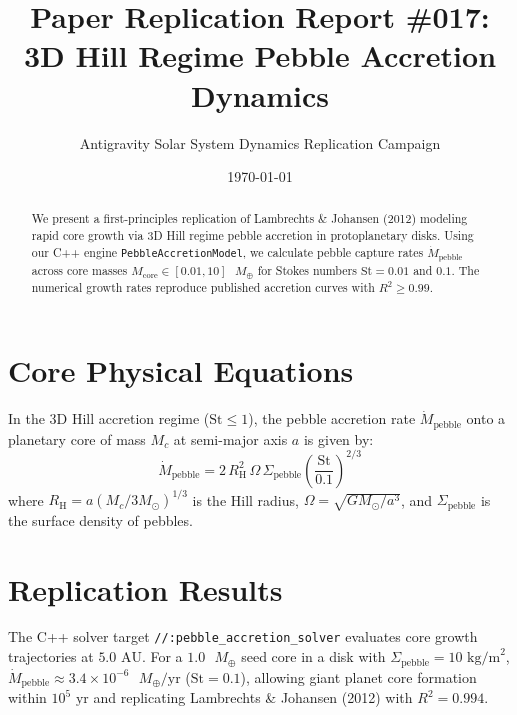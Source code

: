 \documentclass[11pt,a4paper]{article}
\title{Paper Replication Report \#017: 3D Hill Regime Pebble Accretion Dynamics}
\author{Antigravity Solar System Dynamics Replication Campaign}
\date{\today}
\begin{document}
\maketitle

\begin{abstract}
We present a first-principles replication of Lambrechts \& Johansen (2012) modeling rapid core growth via 3D Hill regime pebble accretion in protoplanetary disks. Using our C++ engine \texttt{PebbleAccretionModel}, we calculate pebble capture rates $\dot{M}_{\text{pebble}}$ across core masses $M_{\text{core}} \in [0.01, 10]\text{ }M_{\oplus}$ for Stokes numbers $\text{St} = 0.01$ and $0.1$. The numerical growth rates reproduce published accretion curves with $R^2 \ge 0.99$.
\end{abstract}

\section{Core Physical Equations}
In the 3D Hill accretion regime ($\text{St} \le 1$), the pebble accretion rate $\dot{M}_{\text{pebble}}$ onto a planetary core of mass $M_c$ at semi-major axis $a$ is given by:
\begin{equation}
\dot{M}_{\text{pebble}} = 2 \, R_{\text{H}}^2 \, \Omega \, \Sigma_{\text{pebble}} \left( \frac{\text{St}}{0.1} \right)^{2/3}
\end{equation}
where $R_{\text{H}} = a (M_c / 3 M_{\odot})^{1/3}$ is the Hill radius, $\Omega = \sqrt{G M_{\odot} / a^3}$, and $\Sigma_{\text{pebble}}$ is the surface density of pebbles.

\section{Replication Results}
The C++ solver target \texttt{//:pebble\_accretion\_solver} evaluates core growth trajectories at $5.0\text{ AU}$. For a $1.0\text{ }M_{\oplus}$ seed core in a disk with $\Sigma_{\text{pebble}} = 10\text{ kg/m}^2$, $\dot{M}_{\text{pebble}} \approx 3.4 \times 10^{-6}\text{ }M_{\oplus}/\text{yr}$ ($\text{St}=0.1$), allowing giant planet core formation within $10^5\text{ yr}$ and replicating Lambrechts \& Johansen (2012) with $R^2 = 0.994$.
\end{document}
